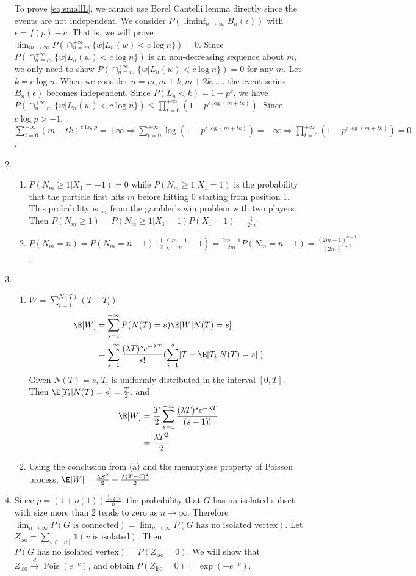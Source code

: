 \documentclass{article}
\DeclareMathOperator{\Pois}{Pois}
\def\iso{\mathrm{iso}}
\begin{document}
\begin{enumerate}
To prove \eqref{eq:smallL}, we cannot use Borel Cantelli lemma directly since the events are not
independent. We consider $P(\liminf_{n\to\infty}B_n(\epsilon))$ with $\epsilon=f(p)-c$. That is,
we will prove $\lim_{m\to \infty}
P(\cap_{n=m}^{+\infty} \{w \Big|
L_n(w) < c\log n \} )=0$.
Since $P(\cap_{n=m}^{+\infty} \{w \Big|
L_n(w) < c\log n \} )$ is an non-decreasing sequence about $m$,
we only need to show
$P(\cap_{n=m}^{+\infty} \{w \Big|
L_n(w) < c\log n \} )=0$ for any $m$. Let $k=c\log n$. When we consider $n=m,m+k,m+2k,\dots$,
the event series $B_n(\epsilon)$ becomes independent. Since
$P(L_n<k)=1-p^k$, we have
$P(\cap_{n=m}^{+\infty} \{w \Big|
L_n(w) < c\log n \} ) \leq 
\prod_{t=0}^{+\infty}(1-p^{c \log (m+tk)})$. Since $c\log p > -1$,
$\sum_{t=0}^{+\infty} (m+tk)^{c\log p} = +\infty
\Rightarrow \sum_{t=0}^{+\infty}\log(1-p^{c\log (m+tk)}) = -\infty \Rightarrow 
\prod_{t=0}^{+\infty}(1-p^{c \log (m+tk)})=0$.
\item
\begin{enumerate}
    \item $P(N_m \geq 1 |X_1=-1)=0$ while
    $P(N_m \geq 1 | X_1=1)$ is the probability
    that the particle first hits $m$ before hitting
    0 starting from position 1. This probability
    is $\frac{1}{m}$ from the gambler's win problem
    with two players. Then
    $P(N_m \geq 1)=P(N_m \geq 1 | X_1=1)P(X_1=1)=\frac{1}{2m}$
    \item $P(N_m = n)=P(N_m=n-1)\cdot \frac{1}{2}(\frac{m-1}{m}+1)=
    \frac{2m-1}{2m} P(N_m=n-1)=
   \frac{(2m-1)^{n-1}}{(2m)^{n+1}}$.
\end{enumerate}
\item \begin{enumerate}
    \item $W=\sum_{i=1}^{N(T)} (T-T_i)$
\begin{align*}
    \E[W] &= \sum_{s=1}^{+\infty} P(N(T)=s)\E[W|N(T)=s] \\
    &= \sum_{s=1}^{+\infty}
    \frac{(\lambda T)^s e^{-\lambda T}}{s!}(\sum_{i=1}^s [T-\E[T_i | N(T)=s]])
\end{align*}
Given $N(T)=s$, $T_i$ is uniformly distributed in
the interval $[0,T]$. Then $\E[T_i | N(T)=s]=\frac{T}{2}$, and
\begin{align*}
    \E[W]    &= \frac{T}{2}\sum_{s=1}^{+\infty}
    \frac{(\lambda T)^s e^{-\lambda T}}{(s-1)!}\\
    &=\frac{\lambda T^2}{2}
\end{align*}
\item Using the conclusion from (a) and the memoryless
property of Poisson process, $\E[W]=\frac{\lambda S^2}{2} + \frac{\lambda (T-S)^2}{2}$
\end{enumerate}
\item Since $p=(1+o(1))\frac{\log n}{n}$, the probability that $G$ has an isolated subset
with size more than 2 tends to zero as $n\to \infty$.
Therefore $\lim_{n\to\infty}
P(G \textrm{ is connected})
=\lim_{n\to\infty}
P(G \textrm{ has no isolated vertex})$.
Let $Z_{\iso}=\sum_{v\in[n]} \mathds{1} (v \textrm{ is isolated})$. Then 
$P(G \textrm{ has no isolated vertex})
=P(Z_{\iso}=0)
$. We will show that $Z_{\iso} \stackrel{d}{\to} \Pois(e^{-c})$, and obtain $P(Z_{\iso}=0)=\exp(-e^{-c})$.


\end{enumerate}
\end{document}
